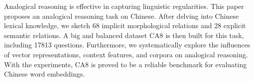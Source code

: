 Analogical reasoning is effective in capturing linguistic regularities. This paper proposes an analogical reasoning task on Chinese. After delving into Chinese lexical knowledge, we sketch 68 implicit morphological relations and 28 explicit semantic relations. A big and balanced dataset CA8 is then built for this task, including 17813 questions. Furthermore, we systematically explore the influences of vector representations, context features, and corpora on analogical reasoning. With the experiments, CA8 is proved to be a reliable benchmark for evaluating Chinese word embeddings.
